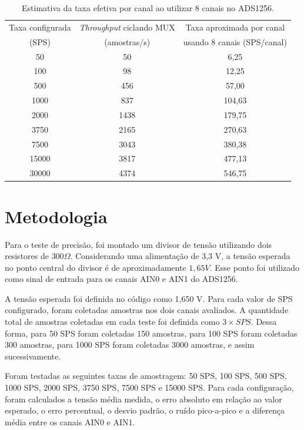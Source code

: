 \documentclass[12pt, a4paper]{article}
\begin{document}
\begin{table}[H]
    \centering
    \caption{Estimativa da taxa efetiva por canal ao utilizar 8 canais no ADS1256.}
    \label{tab:mux_8canais}
    \begin{tabular}{ccc}
        \toprule
        Taxa configurada & \textit{Throughput} ciclando MUX & Taxa aproximada por canal \\
        (SPS) & (amostras/s) & usando 8 canais (SPS/canal) \\
        \midrule
        50    & 50   & 6,25 \\
        100   & 98   & 12,25 \\
        500   & 456  & 57,00 \\
        1000  & 837  & 104,63 \\
        2000  & 1438 & 179,75 \\
        3750  & 2165 & 270,63 \\
        7500  & 3043 & 380,38 \\
        15000 & 3817 & 477,13 \\
        30000 & 4374 & 546,75 \\
        \bottomrule
    \end{tabular}
\end{table}

\section{Metodologia}

Para o teste de precisão, foi montado um divisor de tensão utilizando dois resistores de $300 \Omega$. 
Considerando uma alimentação de 3,3 V, a tensão esperada no ponto central do divisor é de aproximadamente $1,65 V$. 
Esse ponto foi utilizado como sinal de entrada para os canais AIN0 e AIN1 do ADS1256.

A tensão esperada foi definida no código como 1,650 V. 
Para cada valor de SPS configurado, foram coletadas amostras nos dois canais avaliados. 
A quantidade total de amostras coletadas em cada teste foi definida como $3 \times SPS$. 
Dessa forma, para 50 SPS foram coletadas 150 amostras, para 100 SPS foram coletadas 300 amostras, para 1000 SPS foram coletadas 3000 amostras, e assim sucessivamente.

Foram testadas as seguintes taxas de amostragem: 50 SPS, 100 SPS, 500 SPS, 1000 SPS, 2000 SPS, 3750 SPS, 7500 SPS e 15000 SPS. 
Para cada configuração, foram calculados a tensão média medida, o erro absoluto em relação ao valor esperado, 
o erro percentual, o desvio padrão, o ruído pico-a-pico e a diferença média entre os canais AIN0 e AIN1.
\end{document}

